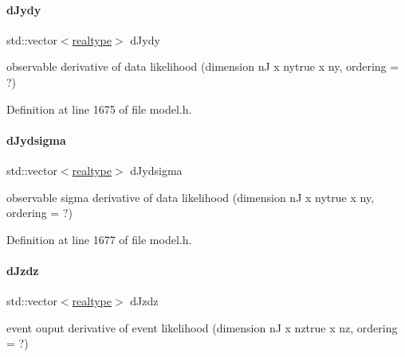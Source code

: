 \mbox{\label{classamici_1_1_model_a3ac4a9286766476c57fba8edbb2da345}} 
\paragraph{\texorpdfstring{d\+Jydy}{dJydy}}
{\footnotesize\ttfamily std\+::vector$<$\mbox{\hyperlink{namespaceamici_a1bdce28051d6a53868f7ccbf5f2c14a3}{realtype}}$>$ d\+Jydy\hspace{0.3cm}{\ttfamily [protected]}}

observable derivative of data likelihood (dimension nJ x nytrue x ny, ordering = ?) 

Definition at line 1675 of file model.\+h.

\mbox{\label{classamici_1_1_model_a32c9ff2e3e5e1fa69bd54ca0ceb41876}} 
\paragraph{\texorpdfstring{d\+Jydsigma}{dJydsigma}}
{\footnotesize\ttfamily std\+::vector$<$\mbox{\hyperlink{namespaceamici_a1bdce28051d6a53868f7ccbf5f2c14a3}{realtype}}$>$ d\+Jydsigma\hspace{0.3cm}{\ttfamily [protected]}}

observable sigma derivative of data likelihood (dimension nJ x nytrue x ny, ordering = ?) 

Definition at line 1677 of file model.\+h.

\mbox{\label{classamici_1_1_model_a6f9b92825da48e6a4b879a31670626f9}} 
\paragraph{\texorpdfstring{d\+Jzdz}{dJzdz}}
{\footnotesize\ttfamily std\+::vector$<$\mbox{\hyperlink{namespaceamici_a1bdce28051d6a53868f7ccbf5f2c14a3}{realtype}}$>$ d\+Jzdz\hspace{0.3cm}{\ttfamily [protected]}}

event ouput derivative of event likelihood (dimension nJ x nztrue x nz, ordering = ?) 

